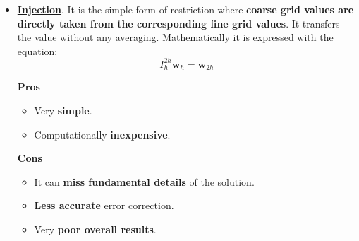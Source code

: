 \begin{itemize}
	\item \underline{\textbf{Injection}}. It is the simple form of restriction where \textbf{coarse grid values are directly taken from the corresponding fine grid values}. It transfers the value without any averaging. Mathematically it is expressed with the equation:
	\begin{equation}
		I^{2h}_{h} \mathbf{w}_{h} = \mathbf{w}_{2h}
	\end{equation}
	\begin{flushleft}
		\textcolor{Green3}{ \textbf{Pros}}
	\end{flushleft}
	\begin{itemize}
		\item Very \textbf{simple}.
		\item Computationally \textbf{inexpensive}.
	\end{itemize}
	\begin{flushleft}
		\textcolor{Red2}{ \textbf{Cons}}
	\end{flushleft}
	\begin{itemize}
		\item It can \textbf{miss fundamental details} of the solution.
		\item \textbf{Less accurate} error correction.
		\item Very \textbf{poor overall results}.
	\end{itemize}
	
	\newpage
	

\end{itemize}

